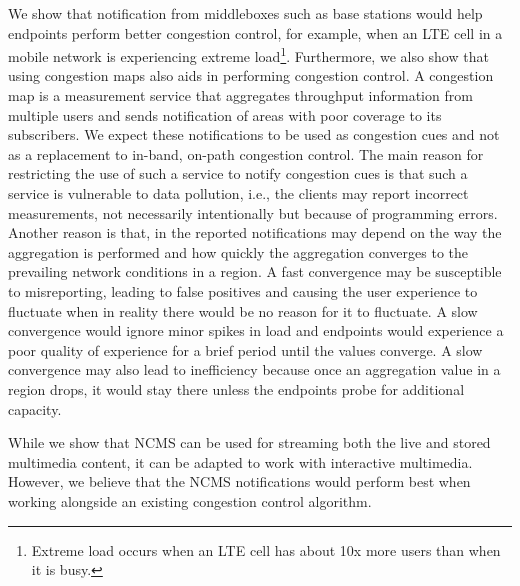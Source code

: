 We show that notification from middleboxes such as base stations would
help endpoints perform better congestion control, for example, when an LTE cell
in a mobile network is experiencing extreme load\footnote{Extreme load
occurs when an LTE cell has about 10x more users than when it is busy.}.
Furthermore, we also show that using congestion maps also aids in performing
congestion control. A congestion map is a measurement service that aggregates
throughput information from multiple users and sends notification of areas
with poor coverage to its subscribers. We expect these notifications to be
used as congestion cues and not as a replacement to in-band, on-path
congestion control. The main reason for restricting the use of such a service
to notify congestion cues is that such a service is vulnerable to data
pollution, i.e., the clients may report incorrect measurements, not
necessarily intentionally but because of programming errors. Another reason is
that, in the reported notifications may depend on the way the aggregation is
performed and how quickly the aggregation converges to the prevailing network
conditions in a region. A fast convergence may be susceptible to misreporting,
leading to false positives and causing the user experience to fluctuate when in
reality there would be no reason for it to fluctuate. A slow convergence would
ignore minor spikes in load and endpoints would experience a poor quality of
experience for a brief period until the values converge. A slow convergence
may also lead to inefficiency because once an aggregation value in a region
drops, it would stay there unless the endpoints probe for additional capacity.

While we show that NCMS can be used for streaming both the live and stored
multimedia content, it can be adapted to work with interactive multimedia.
However, we believe that the NCMS notifications would perform best when
working alongside an existing congestion control algorithm.
